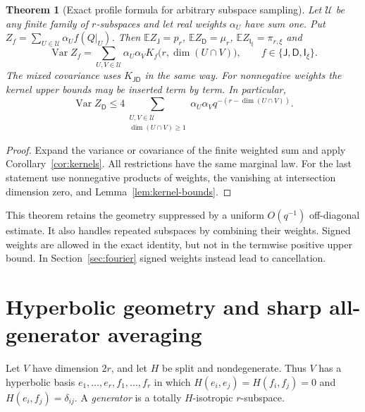 \documentclass[11pt,a4paper]{article}
\newtheorem{theorem}{Theorem}[section]
\theoremstyle{definition}
\theoremstyle{remark}
\newcommand{\E}{\mathbb E}
\newcommand{\Var}{\operatorname{Var}}
\newcommand{\J}{\mathsf J}
\newcommand{\D}{\mathsf D}
\newcommand{\I}{\mathsf I}
\begin{document}
\begin{theorem}[Exact profile formula for arbitrary subspace sampling]
\label{thm:profile}
Let $\mathcal U$ be any finite family of $r$-subspaces and let real weights
$\alpha_U$ have sum one. Put
$Z_f=\sum_{U\in\mathcal U}\alpha_U f(Q|_U)$.
Then $\E Z_\J=p_r$, $\E Z_\D=\mu_r$, $\E Z_{\I_\xi}=\pi_{r,\xi}$ and
\begin{equation}\label{eq:profile}
 \Var Z_f=\sum_{U,V\in\mathcal U}\alpha_U\alpha_V
 K_f\bigl(r,\dim(U\cap V)\bigr),
 \qquad f\in\{\J,\D,\I_\xi\}.
\end{equation}
The mixed covariance uses $K_{\J\D}$ in the same way.
For nonnegative weights the kernel upper bounds may be inserted term by
term. In particular,
\begin{equation}\label{eq:weighted-D-bound}
 \Var Z_\D\le4\sum_{\substack{U,V\in\mathcal U\\\dim(U\cap V)\ge1}}
 \alpha_U\alpha_V q^{-(r-\dim(U\cap V))}.
\end{equation}
\end{theorem}
\begin{proof}
Expand the variance or covariance of the finite weighted sum and apply
Corollary~\ref{cor:kernels}. All restrictions have the same marginal law.
For the last statement use nonnegative products of weights, the vanishing
at intersection dimension zero, and Lemma~\ref{lem:kernel-bounds}.
\end{proof}

This theorem retains the geometry suppressed by a uniform $O(q^{-1})$
off-diagonal estimate. It also handles repeated subspaces by combining
their weights. Signed weights are allowed in the exact identity, but not
in the termwise positive upper bound. In Section~\ref{sec:fourier} signed
weights instead lead to cancellation.

\section{Hyperbolic geometry and sharp all-generator averaging}
\label{sec:polar}
Let $V$ have dimension $2r$, and let $H$ be split and nondegenerate.
Thus $V$ has a hyperbolic basis $e_1,\ldots,e_r,f_1,\ldots,f_r$ in which
$H(e_i,e_j)=H(f_i,f_j)=0$ and $H(e_i,f_j)=\delta_{ij}$.
A \emph{generator} is a totally $H$-isotropic $r$-subspace.
\end{document}

